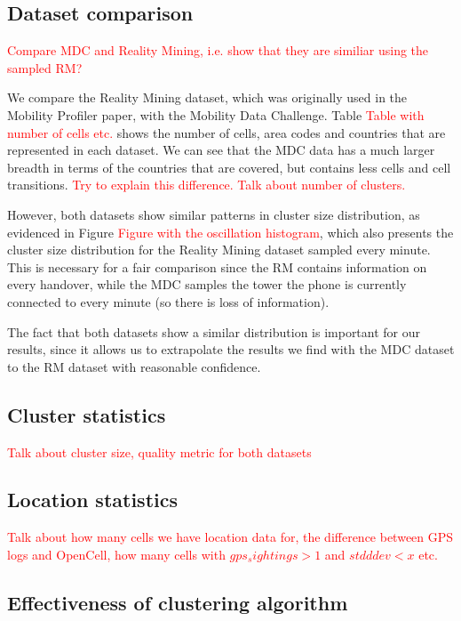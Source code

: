 \documentclass[a4paper,10pt]{article}
\newcommand{\xxx}[1]{\textcolor{red}{#1}}
\begin{document}
\subsection{Dataset comparison}


\xxx{Compare MDC and Reality Mining, i.e. show that they are similiar using the sampled RM?}

We compare the Reality Mining dataset, which was originally used in the Mobility Profiler paper, with the Mobility Data Challenge. Table \xxx{Table with number of cells etc.} shows the number of cells, area codes and countries that are represented in each dataset. We can see that the MDC data has a much larger breadth in terms of the countries that are covered, but contains less cells and cell transitions. \xxx{Try to explain this difference. Talk about number of clusters.}

However, both datasets show similar patterns in cluster size distribution, as evidenced in Figure \xxx{Figure with the oscillation histogram}, which also presents the cluster size distribution for the Reality Mining dataset sampled every minute. This is necessary for a fair comparison since the RM contains information on every handover, while the MDC samples the tower the phone is currently connected to every minute (so there is loss of information).

The fact that both datasets show a similar distribution is important for our results, since it allows us to extrapolate the results we find with the MDC dataset to the RM dataset with reasonable confidence.

\subsection{Cluster statistics}

\xxx{Talk about cluster size, quality metric for both datasets}

\subsection{Location statistics}

\xxx{Talk about how many cells we have location data for, the difference between GPS logs and OpenCell, how many cells with $gps_sightings > 1$ and $stdddev < x$ etc.}

\subsection{Effectiveness of clustering algorithm}
\end{document}
